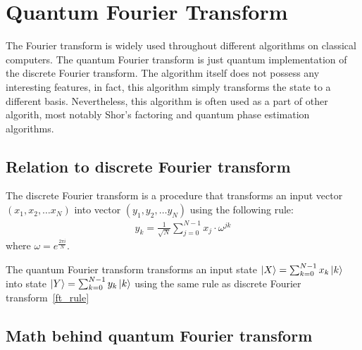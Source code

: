 \section{Quantum Fourier Transform}

The Fourier transform is widely used throughout different algorithms on classical computers.
The quantum Fourier transform is just quantum implementation of the discrete Fourier transform.
The algorithm itself does not possess any interesting features, in fact, this algorithm simply transforms the state to a different basis.
Nevertheless, this algorithm is often used as a part of other algorith, most notably Shor's factoring and quantum phase estimation algorithms.

\subsection{Relation to discrete Fourier transform}

The discrete Fourier transform is a procedure that transforms an input vector $(x_1, x_2, \ldots x_N)$ into vector $(y_1, y_2, \ldots y_N)$ using the following rule:
\begin{align} \label{ft_rule}
    y_k = \frac{1}{\sqrt{N}}\sum_{j=0}^{N-1} x_j\cdot \omega^{jk}
\end{align}
where $\omega = e^{\frac{2\pi i}{N}}$.

The quantum Fourier transform transforms an input state $\ket{X} = \sum_{k=0}^{N-1} x_k\ket{k}$ into state $\ket{Y} = \sum_{k=0}^{N-1} y_k\ket{k}$ using the same rule as discrete Fourier transform~\eqref{ft_rule}

\subsection{Math behind quantum Fourier transform}

